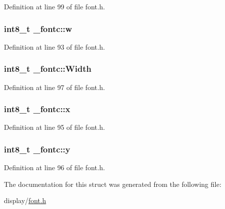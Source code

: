 Definition at line 99 of file font.\-h.

\hypertarget{struct__fontc_a9c2af0354d2b2009e7b6684e25fd479b}{
\subsubsection[{w}]{\setlength{\rightskip}{0pt plus 5cm}int8\-\_\-t \-\_\-fontc\-::w}}\label{struct__fontc_a9c2af0354d2b2009e7b6684e25fd479b}


Definition at line 93 of file font.\-h.

\hypertarget{struct__fontc_ae3c802e1c35ae9a4e37c8eb2e9644325}{
\subsubsection[{Width}]{\setlength{\rightskip}{0pt plus 5cm}int8\-\_\-t \-\_\-fontc\-::\-Width}}\label{struct__fontc_ae3c802e1c35ae9a4e37c8eb2e9644325}


Definition at line 97 of file font.\-h.

\hypertarget{struct__fontc_ad15d00ed46ebe52a085cf05b5ca5da90}{
\subsubsection[{x}]{\setlength{\rightskip}{0pt plus 5cm}int8\-\_\-t \-\_\-fontc\-::x}}\label{struct__fontc_ad15d00ed46ebe52a085cf05b5ca5da90}


Definition at line 95 of file font.\-h.

\hypertarget{struct__fontc_aebbde0dc41068722ee1a69f4a56478a4}{
\subsubsection[{y}]{\setlength{\rightskip}{0pt plus 5cm}int8\-\_\-t \-\_\-fontc\-::y}}\label{struct__fontc_aebbde0dc41068722ee1a69f4a56478a4}


Definition at line 96 of file font.\-h.



The documentation for this struct was generated from the following file\-:\begin{DoxyCompactItemize}
\item 
display/\hyperlink{display_2font_8h}{font.\-h}\end{DoxyCompactItemize}
